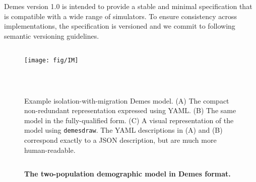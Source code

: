 \documentclass[11pt]{article}
\begin{document}
Demes version 1.0 is intended to provide a stable and minimal specification
that is compatible with a wide range of simulators. To ensure consistency
across implementations, the specification is versioned and we commit to
following semantic versioning guidelines.


\begin{figure}[h!]
    \begin{minipage}{0.44\textwidth}
        \begin{tcolorbox}
            \inputminted[fontsize=\scriptsize,linenos,numbersep=5pt]{yaml}{models/IM.yaml}
        \end{tcolorbox}
        \begin{tcolorbox}
            \texttt{[image: fig/IM]}
        \end{tcolorbox}
    \end{minipage}\hfill
    \begin{minipage}{0.54\textwidth}
        \begin{tcolorbox}
            \inputminted[fontsize=\scriptsize,linenos,numbersep=5pt]{yaml}{models/IM-resolved.yaml}
        \end{tcolorbox}
    \end{minipage}\\
    \caption{
        \label{fig:IM}
        Example isolation-with-migration Demes model. (A) The compact non-redundant
        representation expressed using YAML. (B) The same model in the fully-qualified
        form. (C) A visual representation of the model using \texttt{demesdraw}.
        The YAML descriptions in (A) and (B) correspond exactly to a JSON description,
        but are much more human-readable.
    }
\end{figure}

\begin{figure}[h!]
    \begin{tcolorbox}
        \inputminted[fontsize=\scriptsize,linenos,numbersep=5pt]{yaml}{models/tennessen.yml}
    \end{tcolorbox}
    \caption{
        \textbf{The \citet{tennessen2012evolution} two-population demographic model in Demes format.}
    }
    \label{fig:tennessen}
\end{figure}
\end{document}
